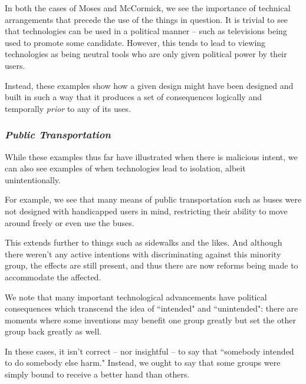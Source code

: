 \documentclass[openany]{book}
\begin{document}
In both the cases of Moses and McCormick, we see the importance of technical arrangements that precede the use of the things in question. It is trivial to see that technologies can be used in a political manner -- such as televisions being used to promote some candidate. However, this tends to lead to viewing technologies as being neutral tools who are only given political power by their users.

Instead, these examples show how a given design might have been designed and built in such a way that it produces a set of consequences logically and temporally \textit{prior} to any of its uses.

\subsubsection{\textit{Public Transportation}}
While these examples thus far have illustrated when there is malicious intent, we can also see examples of when technologies lead to isolation, albeit unintentionally.

\begin{example}
	For example, we see that many means of public transportation such as buses were not designed with handicapped users in mind, restricting their ability to move around freely or even use the buses.
	
	This extends further to things such as sidewalks and the likes. And although there weren't any active intentions with discriminating against this minority group, the effects are still present, and thus there are now reforms being made to accommodate the affected.
\end{example}

We note that many important technological advancements have political consequences which transcend the idea of ``intended" and ``unintended": there are moments where some inventions may benefit one group greatly but set the other group back greatly as well.

In these cases, it isn't correct -- nor insightful -- to say that ``somebody intended to do somebody else harm." Instead, we ought to say that some groups were simply bound to receive a better hand than others.
\end{document}
